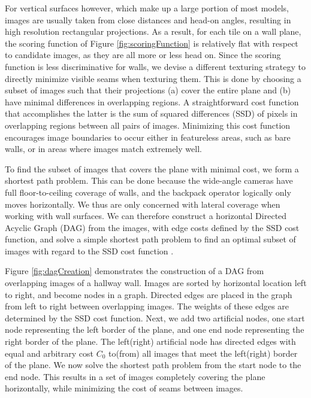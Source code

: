 \documentclass[]{spie}  %
\begin{document}
For vertical surfaces however, which make up a large portion of most
models, images are usually taken from close distances and head-on
angles, resulting in high resolution rectangular projections. As a
result, for each tile on a wall plane, the scoring function of Figure
\ref{fig:scoringFunction} is relatively flat with respect to candidate
images, as they are all more or less head on. Since the scoring
function is less discriminative for walls, we devise a different
texturing strategy to directly minimize visible seams when texturing
them. This is done by choosing a subset of images such that their
projections (a) cover the entire plane and (b) have minimal
differences in overlapping regions. A straightforward cost function
that accomplishes the latter is the sum of squared differences (SSD)
of pixels in overlapping regions between all pairs of
images. Minimizing this cost function encourages image boundaries to
occur either in featureless areas, such as bare walls, or in areas
where images match extremely well.

To find the subset of images that covers the plane with minimal cost,
we form a shortest path problem. This can be done because the
wide-angle cameras have full floor-to-ceiling coverage of walls, and
the backpack operator logically only moves horizontally. We thus are
only concerned with lateral coverage when working with wall
surfaces. We can therefore construct a horizontal Directed Acyclic
Graph (DAG) from the images, with edge costs defined by the SSD cost
function, and solve a simple shortest path problem to find an optimal
subset of images with regard to the SSD cost function \cite{dijkstra}.


Figure \ref{fig:dagCreation} demonstrates the construction of a DAG
from overlapping images of a hallway wall. Images are sorted by
horizontal location left to right, and become nodes in a
graph. Directed edges are placed in the graph from left to right
between overlapping images. The weights of these edges are determined
by the SSD cost function. Next, we add two artificial nodes, one start
node representing the left border of the plane, and one end node
representing the right border of the plane. The left(right) artificial
node has directed edges with equal and arbitrary cost $C_0$ to(from)
all images that meet the left(right) border of the plane. We now solve
the shortest path problem from the start node to the end node. This
results in a set of images completely covering the plane horizontally,
while minimizing the cost of seams between images.
\end{document}

